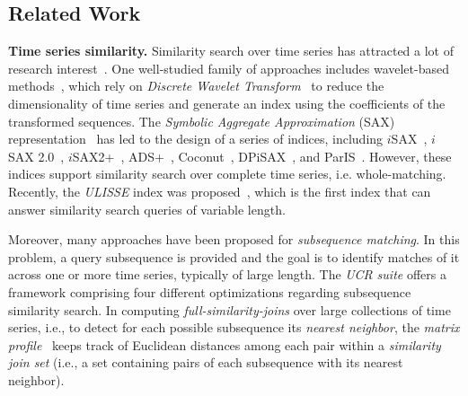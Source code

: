 \subsection{Related Work}
\label{sec:related}

\begin{comment}
Similarity search 
    whole sequence matching 
    subsequence matching
    Correlation (3-4 lines)
Clustering of time series 
Flocks trajectories (mention all related problems -moving clusters, swarms etc, but our problem is more related to flocks)
\end{comment}



 
\textbf{Time series similarity.} 
Similarity search over time series has attracted a lot of research interest~\cite{DBLP:journals/pvldb/EchihabiZPB18}. One well-studied family of approaches includes wavelet-based methods~\cite{chan1999icde}, which rely on \emph{Discrete Wavelet Transform}~\cite{graps1995cse} to reduce the dimensionality of time series and generate an index using the coefficients of the transformed sequences. The \emph{Symbolic Aggregate Approximation} (SAX) representation~\cite{jessica2007dmkd} has led to the design of a series of indices, including $i$SAX~\cite{shieh2008kdd}, $i$SAX 2.0~\cite{camerra2010icdm}, $i$SAX2+~\cite{camerra2014kais}, ADS+~\cite{zoumpatianos2014sigmod}, Coconut~\cite{DBLP:journals/pvldb/KondylakisDZP18}, DPiSAX~\cite{dpisaxjournal}, and ParIS~\cite{DBLP:conf/bigdataconf/PengFP18}. However, these indices support similarity search over complete time series, i.e. whole-matching. Recently, the \textit{ULISSE} index was proposed~\cite{linardi2018scalable}, which is the first index that can answer similarity search queries of variable length. 


Moreover, many approaches have been proposed for \textit{subsequence matching}. In this problem, a query subsequence is provided and the goal is to identify matches of it across one or more time series, typically of large length. The \textit{UCR suite} \cite{rakthanmanon2012searching} offers a framework comprising four different optimizations regarding subsequence similarity search. In computing \textit{full-similarity-joins} over large collections of time series, i.e., to detect for each possible subsequence its \textit{nearest neighbor}, the \textit{matrix profile}~\cite{yeh2016matrix} keeps track of Euclidean distances among each pair within a \textit{similarity join set} (i.e., a set containing pairs of each subsequence with its nearest neighbor).

